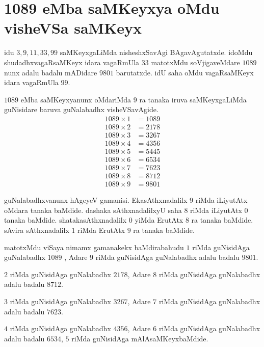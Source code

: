 \section*{{\rm 1089} eMba saMKeyxya oMdu visheVSa saMKeyx}

idu $3,9,11,33,99$ saMKeyxgaLiMda nisheshxSavAgi BAgavAgutatxde. idoMdu shudadhx\-vagaRsaMKeyx idara vagaRmUla $33$ matotxMdu soVjigaveMdare $1089$ nunx adalu badalu mADidare $9801$ barutatxde. idU saha oMdu vagaRsaMKeyx idara vagaRmUla $99$.

$1089$ eMba saMKeyxyanunx oMdariMda $9$ ra tanaka iruva saMKeyxgaLiMda guNisidare baruva guNalabadhx visheVSavAgide.
\begin{align*}
1089\times 1 &= 1089\\
1089\times 2 &= 2178\\ 
1089\times 3 &= 3267\\
1089\times 4 &= 4356\\
1089\times 5 &= 5445\\
1089\times 6 &= 6534\\
1089\times 7 &= 7623\\
1089\times 8 &= 8712\\
1089\times 9 &= 9801
\end{align*}

guNalabadhxvanunx hAgeyeV gamanisi. EkasAthxnadalilx $9$ riMda iLiyutAtx oMdara tanaka baMdide. dashaka sAthxnadalilxyU saha $8$ riMda iLiyutAtx $0$ tanaka baMdide. shataka\-sAthxnadalilx $0$ yiMda ErutAtx $8$ ra tanaka baMdide. sAvira sAthxnadalilx $1$ riMda ErutAtx $9$ ra tanaka baMdide.

matotxMdu viSaya nimamx gamanakekx baMdirabahudu $1$ riMda guNisidAga guNalabadhx $1089$ , Adare $9$ riMda guNisidAga guNalabadhx adalu badalu $9801$.

$2$ riMda guNisidAga guNalabadhx $2178$, Adare $8$ riMda guNisidAga guNalabadhx adalu badalu $8712$.

$3$ riMda guNisidAga guNalabadhx $3267$, Adare $7$ riMda guNisidAga guNalabadhx adalu badalu $7623$.

$4$ riMda guNisidAga guNalabadhx $4356$, Adare $6$ riMda guNisidAga guNalabadhx adalu badalu $6534$, $5$ riMda guNisidAga mAlAsaMKeyxbaMdide.






